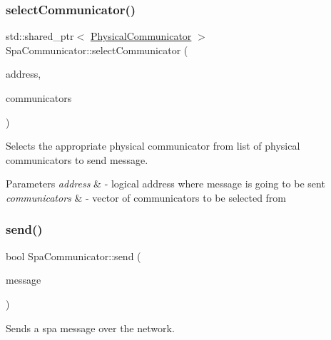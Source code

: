 \subsubsection{\texorpdfstring{select\+Communicator()}{selectCommunicator()}}
{\footnotesize\ttfamily std\+::shared\+\_\+ptr$<$ \hyperlink{classPhysicalCommunicator}{Physical\+Communicator} $>$ Spa\+Communicator\+::select\+Communicator (\begin{DoxyParamCaption}\item[{\hyperlink{structLogicalAddress}{Logical\+Address}}]{address,  }\item[{std\+::vector$<$ std\+::shared\+\_\+ptr$<$ \hyperlink{classPhysicalCommunicator}{Physical\+Communicator} $>$$>$ const \&}]{communicators }\end{DoxyParamCaption})\hspace{0.3cm}{\ttfamily [protected]}}

Selects the appropriate physical communicator from list of physical communicators to send message. 
\begin{DoxyParams}{Parameters}
{\em address} & -\/ logical address where message is going to be sent \\
\hline
{\em communicators} & -\/ vector of communicators to be selected from \\
\hline
\end{DoxyParams}
\mbox{\label{classSpaCommunicator_a4a6decf46398e6a749767d75e429c263}} 
\subsubsection{\texorpdfstring{send()}{send()}\hspace{0.1cm}{\footnotesize\ttfamily [1/3]}}
{\footnotesize\ttfamily bool Spa\+Communicator\+::send (\begin{DoxyParamCaption}\item[{\hyperlink{structSpaMessage}{Spa\+Message} $\ast$}]{message }\end{DoxyParamCaption})}



Sends a spa message over the network. 

\mbox{\label{classSpaCommunicator_a349e67dbbea6ee9abae289729a90f2ba}} 
